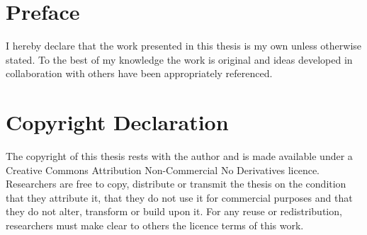 \cleardoublepage{}
{}\mtcaddchapter 
\chapter*{Preface}
\addtocounter{counter}{-1}



I hereby declare that the work presented in this thesis is my own unless otherwise stated. To the best of my knowledge the work is original and ideas developed in collaboration with others have been appropriately referenced.





\cleardoublepage{}
{}\mtcaddchapter 
\chapter*{Copyright Declaration}
\addtocounter{counter}{-1}


The copyright of this thesis rests with the author and is made available under a Creative Commons Attribution Non-Commercial No Derivatives licence. Researchers are free to copy, distribute or transmit the thesis on the condition that they attribute it, that they do not use it for commercial purposes and that they do not alter, transform or build upon it. For any reuse or redistribution, researchers must make clear to others the licence terms of this work.